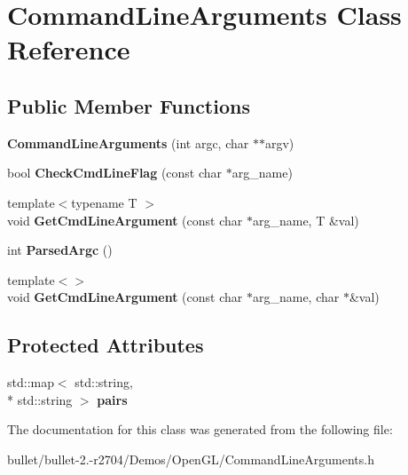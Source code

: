 \hypertarget{class_command_line_arguments}{\section{Command\+Line\+Arguments Class Reference}
\label{class_command_line_arguments}
}
\subsection*{Public Member Functions}
\begin{DoxyCompactItemize}
\item 
\hypertarget{class_command_line_arguments_a3b11272b0531f54ec5013926c4fa34db}{{\bfseries Command\+Line\+Arguments} (int argc, char $\ast$$\ast$argv)}\label{class_command_line_arguments_a3b11272b0531f54ec5013926c4fa34db}

\item 
\hypertarget{class_command_line_arguments_ab876d9016a59f33a1f0009237e6199bb}{bool {\bfseries Check\+Cmd\+Line\+Flag} (const char $\ast$arg\+\_\+name)}\label{class_command_line_arguments_ab876d9016a59f33a1f0009237e6199bb}

\item 
\hypertarget{class_command_line_arguments_a97d8c55e6662a0962dc656f24b2a3423}{{\footnotesize template$<$typename T $>$ }\\void {\bfseries Get\+Cmd\+Line\+Argument} (const char $\ast$arg\+\_\+name, T \&val)}\label{class_command_line_arguments_a97d8c55e6662a0962dc656f24b2a3423}

\item 
\hypertarget{class_command_line_arguments_ae28e61d1570f54b3f9d1e23b247a3ada}{int {\bfseries Parsed\+Argc} ()}\label{class_command_line_arguments_ae28e61d1570f54b3f9d1e23b247a3ada}

\item 
\hypertarget{class_command_line_arguments_af1b7cd9830e34984c04812b5d3f59a18}{{\footnotesize template$<$$>$ }\\void {\bfseries Get\+Cmd\+Line\+Argument} (const char $\ast$arg\+\_\+name, char $\ast$\&val)}\label{class_command_line_arguments_af1b7cd9830e34984c04812b5d3f59a18}

\end{DoxyCompactItemize}
\subsection*{Protected Attributes}
\begin{DoxyCompactItemize}
\item 
\hypertarget{class_command_line_arguments_a9a970ae0f6869b6a448a0f9605e5e649}{std\+::map$<$ std\+::string, \\*
std\+::string $>$ {\bfseries pairs}}\label{class_command_line_arguments_a9a970ae0f6869b6a448a0f9605e5e649}

\end{DoxyCompactItemize}


The documentation for this class was generated from the following file\+:\begin{DoxyCompactItemize}
\item 
bullet/bullet-\/2.-\/r2704/\+Demos/\+Open\+G\+L/Command\+Line\+Arguments.\+h\end{DoxyCompactItemize}
